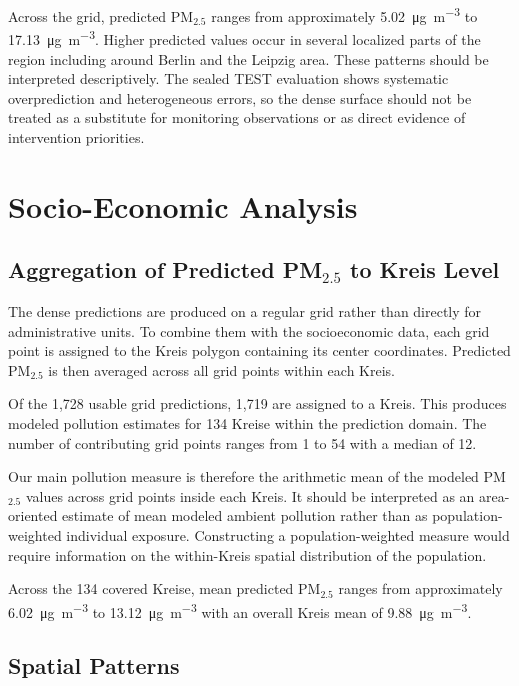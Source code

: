 \documentclass[english, a4paper]{article}
\begin{document}
Across the grid, predicted PM$_{2.5}$ ranges from approximately \SI{5.02}{\micro\gram\per\cubic\meter} to \SI{17.13}{\micro\gram\per\cubic\meter}. Higher predicted values occur in several localized parts of the region including around Berlin and the Leipzig area. These patterns should be interpreted descriptively. The sealed TEST evaluation shows systematic overprediction and heterogeneous errors, so the dense surface should not be treated as a substitute for monitoring observations or as direct evidence of intervention priorities.


\section{Socio-Economic Analysis}
\label{sec:socioeconomic}

\subsection{Aggregation of Predicted PM$_{2.5}$ to Kreis Level}
\label{sec:kreis_aggregation}

The dense predictions are produced on a regular grid rather than directly for administrative units. To combine them with the socioeconomic data, each grid point is assigned to the Kreis polygon containing its center coordinates. Predicted PM$_{2.5}$ is then averaged across all grid points within each Kreis.

Of the 1,728 usable grid predictions, 1,719 are assigned to a Kreis. This produces modeled pollution estimates for 134 Kreise within the prediction domain. The number of contributing grid points ranges from 1 to 54 with a median of 12.

Our main pollution measure is therefore the arithmetic mean of the modeled PM$_{2.5}$ values across grid points inside each Kreis. It should be interpreted as an area-oriented estimate of mean modeled ambient pollution rather than as population-weighted individual exposure. Constructing a population-weighted measure would require information on the within-Kreis spatial distribution of the population.

Across the 134 covered Kreise, mean predicted PM$_{2.5}$ ranges from approximately \SI{6.02}{\micro\gram\per\cubic\meter} to \SI{13.12}{\micro\gram\per\cubic\meter} with an overall Kreis mean of \SI{9.88}{\micro\gram\per\cubic\meter}.


\subsection{Spatial Patterns}
\label{sec:socio_patterns}
\end{document}
